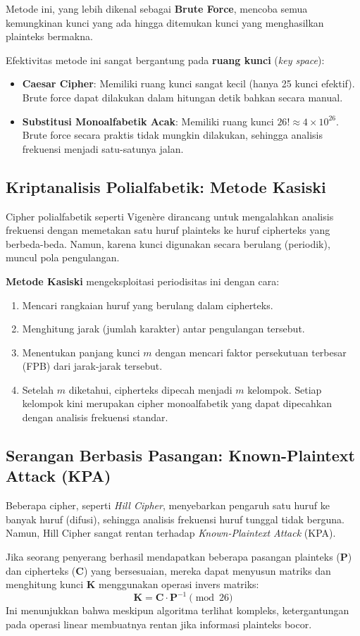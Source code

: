 Metode ini, yang lebih dikenal sebagai \textbf{Brute Force}, mencoba semua kemungkinan kunci yang ada hingga ditemukan kunci yang menghasilkan plainteks bermakna.

Efektivitas metode ini sangat bergantung pada \textbf{ruang kunci} (\textit{key space}):
\begin{itemize}
    \item \textbf{Caesar Cipher}: Memiliki ruang kunci sangat kecil (hanya 25 kunci efektif). Brute force dapat dilakukan dalam hitungan detik bahkan secara manual.
    \item \textbf{Substitusi Monoalfabetik Acak}: Memiliki ruang kunci $26! \approx 4 \times 10^{26}$. Brute force secara praktis tidak mungkin dilakukan, sehingga analisis frekuensi menjadi satu-satunya jalan.
\end{itemize}

\subsection{Kriptanalisis Polialfabetik: Metode Kasiski}

Cipher polialfabetik seperti Vigenère dirancang untuk mengalahkan analisis frekuensi dengan memetakan satu huruf plainteks ke huruf cipherteks yang berbeda-beda. Namun, karena kunci digunakan secara berulang (periodik), muncul pola pengulangan.

\textbf{Metode Kasiski} mengeksploitasi periodisitas ini dengan cara:
\begin{enumerate}
    \item Mencari rangkaian huruf yang berulang dalam cipherteks.
    \item Menghitung jarak (jumlah karakter) antar pengulangan tersebut.
    \item Menentukan panjang kunci $m$ dengan mencari faktor persekutuan terbesar (FPB) dari jarak-jarak tersebut.
    \item Setelah $m$ diketahui, cipherteks dipecah menjadi $m$ kelompok. Setiap kelompok kini merupakan cipher monoalfabetik yang dapat dipecahkan dengan analisis frekuensi standar.
\end{enumerate}

\subsection{Serangan Berbasis Pasangan: Known-Plaintext Attack (KPA)}

Beberapa cipher, seperti \textit{Hill Cipher}, menyebarkan pengaruh satu huruf ke banyak huruf (difusi), sehingga analisis frekuensi huruf tunggal tidak berguna. Namun, Hill Cipher sangat rentan terhadap \textit{Known-Plaintext Attack} (KPA).

Jika seorang penyerang berhasil mendapatkan beberapa pasangan plainteks ($\mathbf{P}$) dan cipherteks ($\mathbf{C}$) yang bersesuaian, mereka dapat menyusun matriks dan menghitung kunci $\mathbf{K}$ menggunakan operasi invers matriks:
\[ \mathbf{K} = \mathbf{C} \cdot \mathbf{P}^{-1} \pmod{26} \]
Ini menunjukkan bahwa meskipun algoritma terlihat kompleks, ketergantungan pada operasi linear membuatnya rentan jika informasi plainteks bocor.
